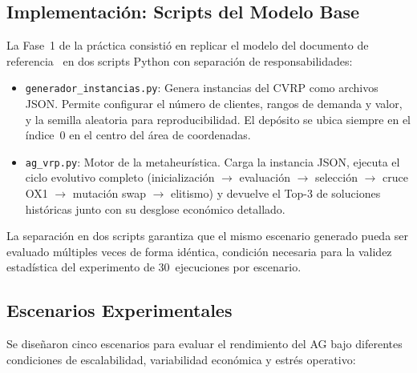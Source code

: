 \documentclass[12pt,letterpaper]{article}
\begin{document}
\subsection{Implementación: Scripts del Modelo Base}

La Fase~1 de la práctica consistió en replicar el modelo del documento de referencia~\cite{porras2026} en dos scripts Python con separación de responsabilidades:

\begin{itemize}
    \item \texttt{generador\_instancias.py}: Genera instancias del CVRP como archivos JSON. Permite configurar el número de clientes, rangos de demanda y valor, y la semilla aleatoria para reproducibilidad. El depósito se ubica siempre en el índice~0 en el centro del área de coordenadas.

    \item \texttt{ag\_vrp.py}: Motor de la metaheurística. Carga la instancia JSON, ejecuta el ciclo evolutivo completo (inicialización $\rightarrow$ evaluación $\rightarrow$ selección $\rightarrow$ cruce OX1 $\rightarrow$ mutación swap $\rightarrow$ elitismo) y devuelve el Top-3 de soluciones históricas junto con su desglose económico detallado.
\end{itemize}

La separación en dos scripts garantiza que el mismo escenario generado pueda ser evaluado múltiples veces de forma idéntica, condición necesaria para la validez estadística del experimento de 30~ejecuciones por escenario.

\subsection{Escenarios Experimentales}

Se diseñaron cinco escenarios para evaluar el rendimiento del AG bajo diferentes condiciones de escalabilidad, variabilidad económica y estrés operativo:
\end{document}
